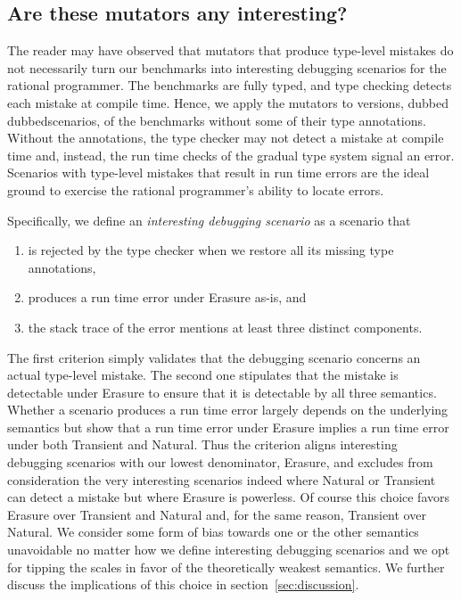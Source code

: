 \subsection{Are these mutators any interesting?} \label{sub:interesting}

The reader may have observed that mutators that produce 
type-level mistakes do not necessarily turn our benchmarks into
interesting debugging scenarios for the rational programmer.  The
benchmarks are fully typed, and type checking detects each mistake at
compile time.  Hence, we apply the mutators to versions, dubbed
dubbed{scenarios}, of the benchmarks without 
some  of their type annotations.  Without the annotations, the type
checker may not detect a mistake at compile time and, instead, the run
time checks
of the gradual type system signal an error.  Scenarios
with type-level mistakes that result in run time errors are the ideal
ground to exercise the rational programmer's ability to locate errors.

Specifically, we define an \emph{interesting debugging scenario} as a
scenario that
\begin{enumerate} 
  \item is rejected by the type checker when we restore all its missing type annotations, 
  \item produces a run time error under Erasure as-is, and 
  \item the stack trace of the error mentions at least three distinct components.  
\end{enumerate}

The first criterion simply validates that the debugging scenario concerns
an actual type-level mistake. The second one stipulates that the mistake is
detectable under Erasure to ensure that it is detectable by all three
semantics.   Whether a scenario produces a run time error largely depends on 
the underlying semantics but \citet{gfd-oopsla-2019}
show that a run time error under Erasure implies a run time
error under both Transient and Natural. Thus the criterion aligns
interesting debugging scenarios with our lowest denominator, Erasure, 
and excludes  from consideration the very interesting scenarios indeed where Natural or
Transient can detect a mistake but where Erasure is powerless. Of course this choice favors
Erasure over Transient and Natural and, for the same reason, Transient over
Natural. We consider some form of bias towards one or the other semantics
unavoidable no matter how we define interesting debugging scenarios and we
opt for tipping the scales in favor of the theoretically weakest
semantics. We further discuss the implications of this choice in
section~\ref{sec:discussion}.

